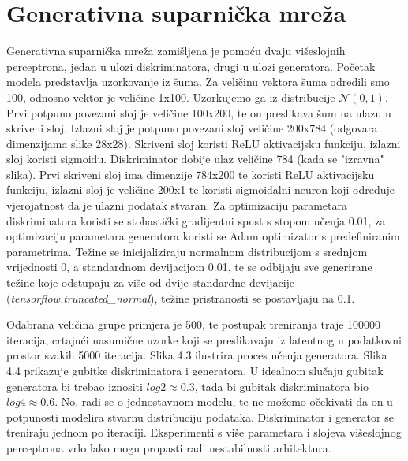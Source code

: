 \documentclass[times, utf8, diplomski]{fer}
\begin{document}
\section{Generativna suparnička mreža}
Generativna suparnička mreža zamišljena je pomoću dvaju višeslojnih perceptrona, jedan u ulozi diskriminatora, drugi u ulozi generatora. Početak modela predstavlja uzorkovanje iz šuma. Za veličinu vektora šuma odredili smo 100, odnosno vektor je veličine 1x100. Uzorkujemo ga iz distribucije $\mathcal{N}(0,1)$. Prvi potpuno povezani sloj je veličine 100x200, te on preslikava šum na ulazu u skriveni sloj. Izlazni sloj je potpuno povezani sloj veličine 200x784 (odgovara dimenzijama slike 28x28). Skriveni sloj koristi ReLU aktivacijsku funkciju, izlazni sloj koristi sigmoidu. Diskriminator dobije ulaz veličine 784 (kada se "izravna" slika). Prvi skriveni sloj ima dimenzije 784x200 te koristi ReLU aktivacijsku funkciju, izlazni sloj je veličine 200x1 te koristi sigmoidalni neuron koji određuje vjerojatnost da je ulazni podatak stvaran. Za optimizaciju parametara diskriminatora koristi se stohastički gradijentni spust s stopom učenja 0.01, za optimizaciju parametara generatora koristi se Adam optimizator s predefiniranim parametrima. Težine se inicijaliziraju normalnom distribucijom s srednjom vrijednosti 0, a standardnom devijacijom 0.01, te se odbijaju sve generirane težine koje odstupaju za više od dvije standardne devijacije (\textit{tensorflow.truncated\_normal}), težine pristranosti se postavljaju na 0.1.\par

Odabrana veličina grupe primjera je 500, te postupak treniranja traje 100000 iteracija, crtajući nasumične uzorke koji se preslikavaju iz latentnog u podatkovni prostor svakih 5000 iteracija. Slika 4.3 ilustrira proces učenja generatora. Slika 4.4 prikazuje gubitke diskriminatora i generatora. U idealnom slučaju gubitak generatora bi trebao iznositi $log 2 \approx 0.3$, tada bi gubitak diskriminatora bio $log 4 \approx 0.6$. No, radi se o jednostavnom modelu, te ne možemo očekivati da on u potpunosti modelira stvarnu distribuciju podataka. Diskriminator i generator se treniraju jednom po iteraciji. Eksperimenti s više parametara i slojeva višeslojnog perceptrona vrlo lako mogu propasti radi nestabilnosti arhitektura. 
\end{document}
